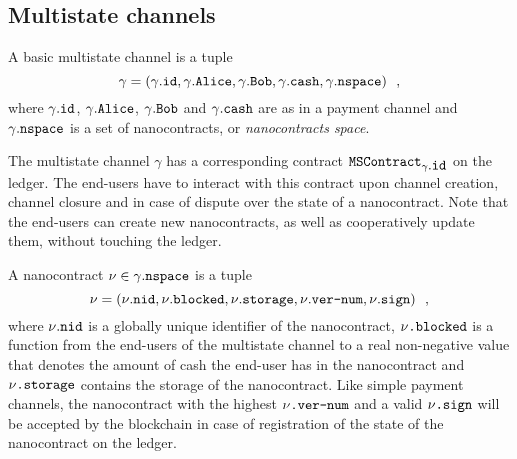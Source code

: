\subsection{Multistate channels}
  A basic multistate channel is a tuple
  \begin{equation*}
    \gamma = \left(\gamma\mbox{.\texttt{id}}, \gamma\mbox{.\texttt{Alice}},
    \gamma\mbox{.\texttt{Bob}}, \gamma\mbox{.\texttt{cash}},
    \gamma\mbox{.\texttt{nspace}}\right) \enspace,
  \end{equation*}
  where $\gamma\mbox{.\texttt{id}}$, $\gamma\mbox{.\texttt{Alice}}$,
  $\gamma\mbox{.\texttt{Bob}}$ and $\gamma\mbox{.\texttt{cash}}$ are as in a payment
  channel and $\gamma\mbox{.\texttt{nspace}}$ is a set of nanocontracts, or
  \textit{nanocontracts space}.

  The multistate channel $\gamma$ has a corresponding contract
  $\mbox{\texttt{MSContract}}_{\gamma\mbox{.\texttt{id}}}$ on the ledger. The end-users
  have to interact with this contract upon channel creation, channel closure and in case
  of dispute over the state of a nanocontract. Note that the end-users can create new
  nanocontracts, as well as cooperatively update them, without touching the ledger.

  A nanocontract $\nu \in \gamma\mbox{.\texttt{nspace}}$ is a tuple
  \begin{equation*}
    \nu = \left(\nu\mbox{.\texttt{nid}}, \nu\mbox{.\texttt{blocked}},
    \nu\mbox{.\texttt{storage}}, \nu\mbox{.\texttt{ver-num}},
    \nu\mbox{.\texttt{sign}}\right) \enspace,
  \end{equation*}
  where $\nu\mbox{.\texttt{nid}}$ is a globally unique identifier of the nanocontract,
  $\nu\mbox{\texttt{.blocked}}$ is a function from the end-users of the multistate channel
  to a real non-negative value that denotes the amount of cash the end-user has in the
  nanocontract and $\nu\mbox{\texttt{.storage}}$ contains the storage of the nanocontract.
  Like simple payment channels, the nanocontract with the highest
  $\nu\mbox{\texttt{.ver-num}}$ and a valid $\nu\mbox{\texttt{.sign}}$ will be accepted by
  the blockchain in case of registration of the state of the nanocontract on the ledger.

